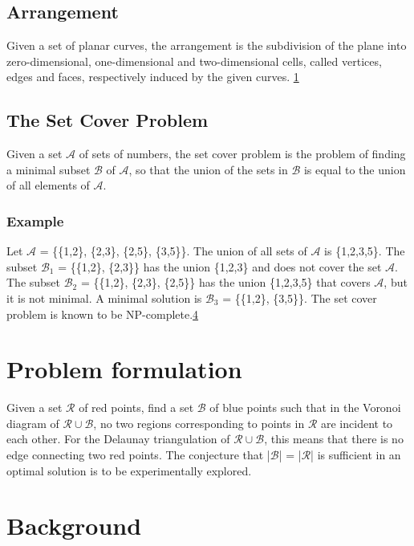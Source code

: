 \documentclass[a4paper,12pt]{article}
\begin{document}
\subsection{Arrangement}
\label{sec:arrangement}
Given a set of planar curves, the arrangement is the subdivision of the plane into zero-dimensional, one-dimensional and two-dimensional cells, called vertices, edges and faces, respectively induced by the given curves. \hyperref[ref:cgal]{1}

\subsection{The Set Cover Problem}
Given a set $\mathcal A$ of sets of numbers, the set cover problem is the problem of finding a minimal subset $\mathcal B$ of $\mathcal A$, so that the union of the sets in $\mathcal B$ is equal to the union of all elements of $\mathcal A$.

\subsubsection{Example}
Let $\mathcal A$ =  \{\{1,2\}, \{2,3\}, \{2,5\}, \{3,5\}\}. The union of all sets of $\mathcal A$ is \{1,2,3,5\}. \newline
The subset $\mathcal B_1$ = \{\{1,2\}, \{2,3\}\} has the union \{1,2,3\} and does not cover the set $\mathcal A$. \newline
The subset $\mathcal B_2$ = \{\{1,2\}, \{2,3\}, \{2,5\}\} has the union \{1,2,3,5\} that covers $\mathcal A$, but it is not minimal. \newline
A minimal solution is $\mathcal B_3$ = \{\{1,2\}, \{3,5\}\}. \newline
The set cover problem is known to be NP-complete.\hyperref[ref:karp]{4}
\section{Problem formulation}
Given a set $\mathcal{R}$ of red points, find a set $\mathcal{B}$ of blue points such that in the Voronoi diagram of $\mathcal{R} \cup \mathcal{B}$, no two regions corresponding to points in $\mathcal{R}$ are incident to each other. For the Delaunay triangulation of $\mathcal{R} \cup \mathcal{B}$, this means that there is no edge connecting two red points. The conjecture that |$\mathcal{B}$| = |$\mathcal{R}$| is sufficient in an optimal solution is to be experimentally explored.


\section{Background}
\end{document}
